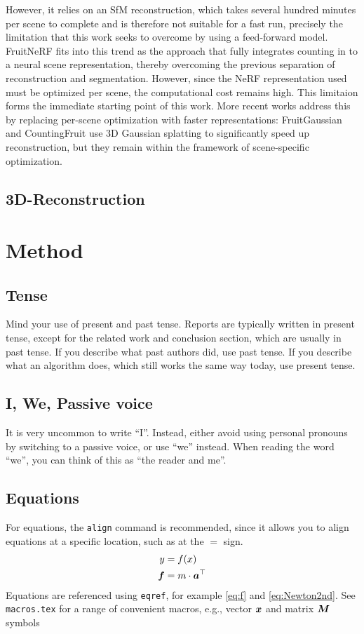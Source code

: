 \documentclass[english, egger, bsc]{vcethesis}
\begin{document}
However, it relies on an SfM reconstruction, which takes several hundred minutes per scene to complete and is therefore not suitable for a fast run, precisely the limitation that this work seeks to overcome by using a feed-forward model.
\\FruitNeRF \cite{meyer2024fruitnerf} fits into this trend as the approach that fully integrates counting in to a neural scene representation, 
thereby overcoming the previous separation of reconstruction and segmentation. However, since the NeRF representation used must be optimized per scene, the computational cost remains high.
This limitaion forms the immediate starting point of this work. More recent works address this by replacing per-scene optimization with faster representations: 
FruitGaussian \cite{hong2025} and CountingFruit \cite{li2025} use 3D Gaussian splatting to significantly speed up reconstruction, but they remain within the framework of scene-specific optimization.
\section{3D-Reconstruction}

\chapter{Method}

\section{Tense}
Mind your use of present and past tense.
Reports are typically written in present tense, except for the related work and conclusion section, which are usually in past tense.
If you describe what past authors did, use past tense.
If you describe what an algorithm does, which still works the same way today, use present tense.

\section{I, We, Passive voice}
It is very uncommon to write ``I''.
Instead, either avoid using personal pronouns by switching to a passive voice, or use ``we'' instead.
When reading the word ``we'', you can think of this as ``the reader and me''.

\section{Equations}
For equations, the \texttt{align} command is recommended, since it allows you to align equations at a specific location, such as at the $=$ sign.
\begin{align}
    y &= f(x)                           \label{eq:f}            \\
    \boldsymbol{f} &= m \cdot \boldsymbol{a}^\top    \label{eq:Newton2nd}
\end{align}
Equations are referenced using \texttt{eqref}, for example \eqref{eq:f} and \eqref{eq:Newton2nd}.
See \texttt{macros.tex} for a range of convenient macros, e.g., vector $\boldsymbol{x}$ and matrix $\boldsymbol{M}$ symbols 
\end{document}
